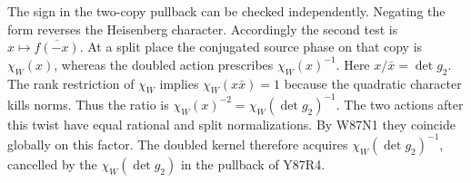 The sign in the two-copy pullback can be checked independently.
Negating the form reverses the Heisenberg character. Accordingly
the second test is $x\mapsto\overline{f(-x)}$. At a split place the
conjugated source phase on that copy is $\chi_W(x)$, whereas
the doubled action prescribes $\chi_W(x)^{-1}$. Here
$x/\bar x=\det g_2$. The rank restriction of $\chi_W$ implies
$\chi_W(x\bar x)=1$ because the quadratic character kills norms.
Thus the ratio is $\chi_W(x)^{-2}=\chi_W(\det g_2)^{-1}$.
The two actions after this twist have equal rational and split
normalizations. By W87N1 they coincide globally on this factor.
The doubled kernel therefore acquires
$\chi_W(\det g_2)^{-1}$, cancelled by the
$\chi_W(\det g_2)$ in the pullback of Y87R4.
